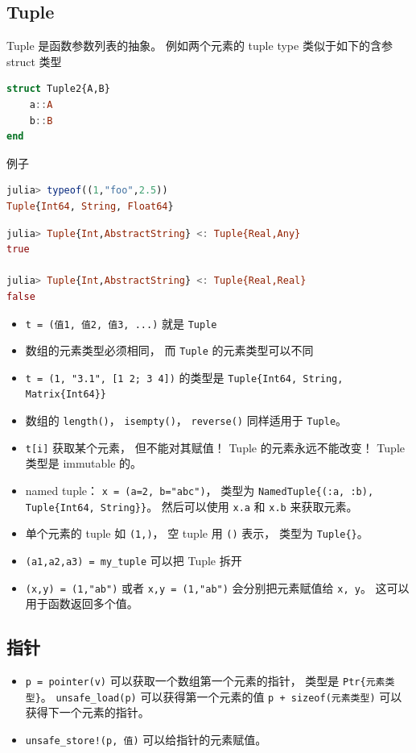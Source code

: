 \subsection{Tuple}
Tuple 是函数参数列表的抽象。 例如两个元素的 tuple type 类似于如下的含参 struct 类型
\begin{lstlisting}[language=julia]
struct Tuple2{A,B}
    a::A
    b::B
end
\end{lstlisting}
例子
\begin{lstlisting}[language=julia]
julia> typeof((1,"foo",2.5))
Tuple{Int64, String, Float64}
\end{lstlisting}
\begin{lstlisting}[language=julia]
julia> Tuple{Int,AbstractString} <: Tuple{Real,Any}
true

julia> Tuple{Int,AbstractString} <: Tuple{Real,Real}
false
\end{lstlisting}

\begin{itemize}
\item \verb`t = (值1, 值2, 值3, ...)` 就是 \verb`Tuple`
\item 数组的元素类型必须相同， 而 \verb`Tuple` 的元素类型可以不同
\item \verb`t = (1, "3.1", [1 2; 3 4])` 的类型是 \verb`Tuple{Int64, String, Matrix{Int64}}`
\item 数组的 \verb`length()`， \verb`isempty()`， \verb`reverse()` 同样适用于 \verb`Tuple`。
\item \verb`t[i]` 获取某个元素， 但不能对其赋值！ Tuple 的元素永远不能改变！ Tuple 类型是 immutable 的。
\item named tuple： \verb`x = (a=2, b="abc")`， 类型为 \verb`NamedTuple{(:a, :b), Tuple{Int64, String}}`。 然后可以使用 \verb`x.a` 和 \verb`x.b` 来获取元素。
\item 单个元素的 tuple 如 \verb`(1,)`， 空 tuple 用 \verb`()` 表示， 类型为 \verb`Tuple{}`。
\item \verb`(a1,a2,a3) = my_tuple` 可以把 Tuple 拆开
\item \verb`(x,y) = (1,"ab")` 或者 \verb`x,y = (1,"ab")` 会分别把元素赋值给 \verb`x, y`。 这可以用于函数返回多个值。
\end{itemize}

\subsection{指针}
\begin{itemize}
\item \verb`p = pointer(v)` 可以获取一个数组第一个元素的指针， 类型是 \verb`Ptr{元素类型}`。 \verb`unsafe_load(p)` 可以获得第一个元素的值 \verb`p + sizeof(元素类型)` 可以获得下一个元素的指针。
\item \verb`unsafe_store!(p, 值)` 可以给指针的元素赋值。
\end{itemize}


